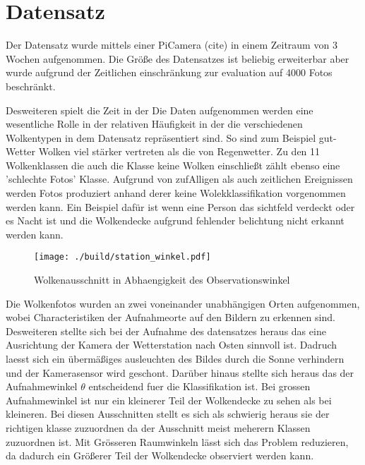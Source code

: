 \section{Datensatz}
\label{sec:02_Datensatz}

Der Datensatz wurde mittels einer PiCamera (cite) in einem Zeitraum von 3 Wochen
aufgenommen. 
Die Größe des Datensatzes ist beliebig erweiterbar aber wurde aufgrund der
Zeitlichen einschränkung zur evaluation auf \num{4000} Fotos beschränkt. 

Desweiteren spielt die Zeit in der Die Daten aufgenommen werden eine wesentliche
Rolle in der relativen Häufigkeit in der die verschiedenen Wolkentypen in dem
Datensatz repräsentiert sind. 
So sind zum Beispiel gut-Wetter Wolken viel stärker vertreten als die von
Regenwetter. 
Zu den 11 Wolkenklassen die auch die Klasse keine Wolken einschließt zählt
ebenso eine 'schlechte Fotos' Klasse. 
Aufgrund von zufAlligen als auch zeitlichen Ereignissen werden Fotos produziert
anhand derer keine Wolekklassifikation vorgenommen werden kann.
Ein Beispiel dafür ist wenn eine Person das sichtfeld verdeckt oder es Nacht ist
und die Wolkendecke aufgrund fehlender belichtung nicht erkannt werden kann. 

\begin{wrapfigure}{l}{0.35\textwidth}
		\centering
		\vspace{-0.5cm}
		\texttt{[image: ./build/station\_winkel.pdf]}
		\caption{Wolkenausschnitt in Abhaengigkeit des Observationswinkel}
		\label{fig:theta}
		\vspace{-0.5cm}
\end{wrapfigure}
Die Wolkenfotos wurden an zwei voneinander unabhängigen Orten aufgenommen, wobei
Characteristiken der Aufnahmeorte auf den Bildern zu erkennen sind.
Desweiteren stellte sich bei der Aufnahme des datensatzes heraus das eine
Ausrichtung der Kamera der Wetterstation nach Osten sinnvoll ist.
Dadruch laesst sich ein übermäßiges ausleuchten des Bildes durch die Sonne
verhindern und der Kamerasensor wird geschont.
Darüber hinaus stellte sich heraus das der Aufnahmewinkel $\theta$ entscheidend
fuer die Klassifikation ist. 
Bei grossen Aufnahmewinkel ist nur ein kleinerer Teil der Wolkendecke zu sehen
als bei kleineren.
Bei diesen Ausschnitten stellt es sich als schwierig heraus sie der richtigen
klasse zuzuordnen da der Ausschnitt meist meherern Klassen zuzuordnen ist. 
Mit Grösseren Raumwinkeln lässt sich das Problem reduzieren, da dadurch ein
Größerer Teil der Wolkendecke observiert werden kann. 

